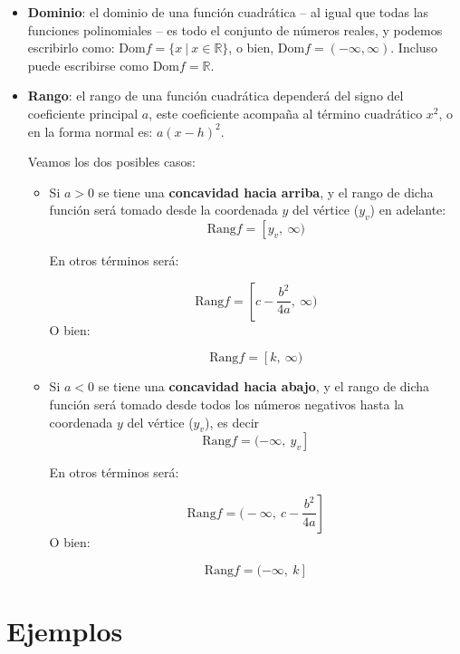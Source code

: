 \documentclass[A4paper, 10pt, oneside]{book}
\begin{document}
	\begin{itemize}
		\item \textbf{Dominio}: el dominio de una función cuadrática -- al igual que todas las funciones polinomiales -- es todo el conjunto de números reales, y podemos escribirlo como: $\text{Dom}f = \{x\ \big| \ x \in \mathbb{R}\}$, o bien, $\text{Dom}f = (-\infty, \infty)$. Incluso puede escribirse como $\text{Dom}f = \mathbb{R}$. 
		
		\item \textbf{Rango}: el rango de una función cuadrática dependerá del signo del coeficiente principal $a$, este coeficiente acompaña al término cuadrático $x^2$, o en la forma normal es: $a(x-h)^2$. 
		
		Veamos los dos posibles casos:
		
		\begin{itemize}
			\item Si $a>0$ se tiene una \textbf{concavidad hacia arriba}, y el rango de dicha función será tomado desde la coordenada $y$ del vértice ($y_v$) en adelante: $$\text{Rang}f = \left[y_v, \ \infty\right.)$$
			
			En otros términos será:
			
			$$\text{Rang}f = \left[c-\frac{b^2}{4a}, \ \infty\right.\bigg)$$ O bien:
			
			$$\text{Rang}f = \left[k, \ \infty\right.)$$
			
			
			\item Si $a<0$ se tiene una \textbf{concavidad hacia abajo}, y el rango de dicha función será tomado desde todos los números negativos hasta la coordenada $y$ del vértice ($y_v$), es decir $$\text{Rang}f = \left.(-\infty, \ y_v\right]$$
			
			En otros términos será:
			
			$$\text{Rang}f = \left.\bigg(-\infty, \ c-\frac{b^2}{4a}\right]$$ O bien:
			
			$$\text{Rang}f = \left.(-\infty, \ k\right]$$
		\end{itemize}
	\end{itemize}
	
	\section{Ejemplos}
	
\end{document}
